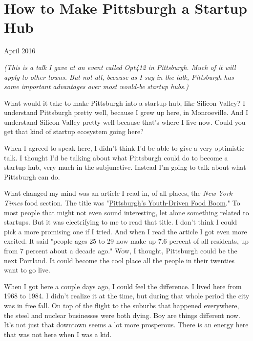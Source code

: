 \chapter{How to Make Pittsburgh a Startup Hub}


            
              
                

April 2016

\emph{(This is a talk I gave at an event called Opt412 in
                    Pittsburgh. Much of it will apply to other towns. But not
                    all, because as I say in the talk, Pittsburgh has some
                    important advantages over most would-be startup hubs.)}

What would it take to make Pittsburgh into a
                  startup hub, like Silicon Valley? I understand Pittsburgh
                  pretty well, because I grew up here, in Monroeville. And I
                  understand Silicon Valley pretty well because that's where I
                  live now. Could you get that kind of startup ecosystem going
                  here?

When I agreed to speak here, I didn't think
                  I'd be able to give a very optimistic talk. I thought I'd be
                  talking about what Pittsburgh could do to become a startup
                  hub, very much in the subjunctive. Instead I'm going to talk
                  about what Pittsburgh can do.

What changed my mind
                  was an article I read in, of all places, the
                  \emph{New York Times} food section. The title was "\href{http://www.nytimes.com/2016/03/16/dining/pittsburgh-restaurants.html}{\underline{Pittsburgh's Youth-Driven Food Boom}}." To most people that might not even sound interesting, let
                  alone something related to startups. But it was electrifying
                  to me to read that title. I don't think I could pick a more
                  promising one if I tried. And when I read the article I got
                  even more excited. It said "people ages 25 to 29 now make up
                  7.6 percent of all residents, up from 7 percent about a decade
                  ago." Wow, I thought, Pittsburgh could be the next Portland.
                  It could become the cool place all the people in their
                  twenties want to go live.

When I got here a couple
                  days ago, I could feel the difference. I lived here from 1968
                  to 1984. I didn't realize it at the time, but during that
                  whole period the city was in free fall. On top of the flight
                  to the suburbs that happened everywhere, the steel and nuclear
                  businesses were both dying. Boy are things different now. It's
                  not just that downtown seems a lot more prosperous. There is
                  an energy here that was not here when I was a kid.

